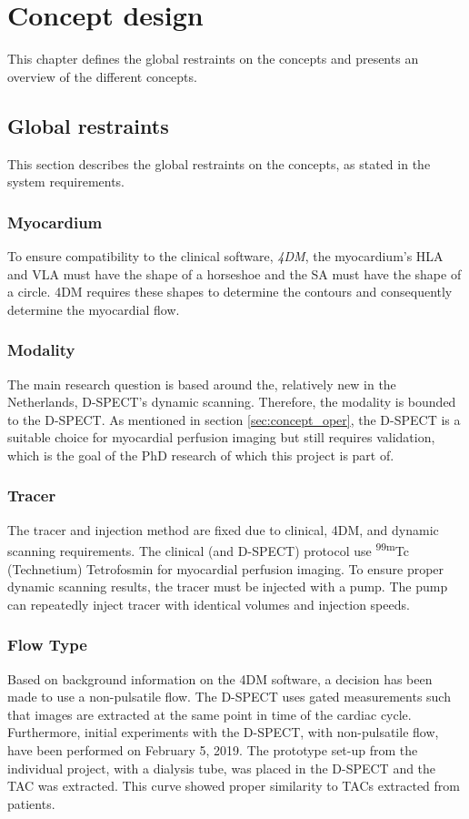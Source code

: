 \chapter{Concept design}
This chapter defines the global restraints on the concepts and presents an overview of the different concepts.

\section{Global restraints}
This section describes the global restraints on the concepts, as stated in the system requirements. 
\subsection{Myocardium}
\label{sec:myocardium}
To ensure compatibility to the clinical software, \textit{4DM}, the myocardium's HLA and VLA must have the shape of a horseshoe and the SA must have the shape of a circle. 4DM requires these shapes to determine the contours and consequently determine the myocardial flow.
\subsection{Modality}
\label{sec:modality}
The main research question is based around the, relatively new in the Netherlands, D-SPECT's dynamic scanning. Therefore, the modality is bounded to the D-SPECT. As mentioned in section \ref{sec:concept_oper}, the D-SPECT is a suitable choice for myocardial perfusion imaging but still requires validation, which is the goal of the PhD research of which this project is part of.
\subsection{Tracer}
\label{sec:tracer}
The tracer and injection method are fixed due to clinical, 4DM, and dynamic scanning requirements. The clinical (and D-SPECT) protocol use \textsuperscript{99m}Tc (Technetium) Tetrofosmin for myocardial perfusion imaging. To ensure proper dynamic scanning results, the tracer must be injected with a pump. The pump can repeatedly inject tracer with identical volumes and injection speeds.
\subsection{Flow Type}
\label{sec:flowType}
Based on background information on the 4DM software, a decision has been made to use a non-pulsatile flow. The D-SPECT uses gated measurements such that images are extracted at the same point in time of the cardiac cycle. Furthermore, initial experiments with the D-SPECT, with non-pulsatile flow, have been performed on February 5, 2019. The prototype set-up from the individual project, with a dialysis tube, was placed in the D-SPECT and the TAC was extracted. This curve showed proper similarity to TACs extracted from patients.
